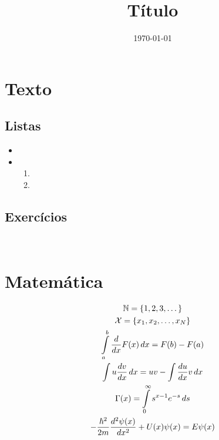 \documentclass[red, ccm, assignment]{templateccm}
\title{Título}              %
\date{\today}               %
\institute{Instituto}
\begin{document}
\maketitle

\section{Texto}

\lipsum[1-2]

\subsection{Listas}

\begin{itemize}
    \item \lipsum[3-3]
    \item \lipsum[4-4]
    \begin{enumerate}
        \item \lipsum[5-5]
        \item \lipsum[6-6]
    \end{enumerate}
\end{itemize}

\subsection{Exercícios}

\begin{exercise}
    \item \lipsum[7-7]
    \item \lipsum[8-8]
    \item ~
    \begin{exercise}
        \item \lipsum[9-9]
        \item \lipsum[10-10]
    \end{exercise}
\end{exercise}

\section{Matemática}

\begin{gather*}
    \mathbb{N} = \{ 1, 2, 3, \dots \} \\
    \mathcal{X} = \{ x_1, x_2, \dots, x_N \} \\
    \int\limits_a^b {\frac{d}{dx} F(x) \, dx}  = F(b) - F(a) \\
    \int u \frac{dv}{dx} \, dx = uv - \int \frac{du}{dx} v \, dx \\
    \Gamma(x) = \int\limits_0^\infty s^{x - 1} e^{-s} \, ds \\
    -\frac{\hbar^2}{2m}\frac{d^2 \psi(x)}{dx^2} + U(x)\psi (x) = E \psi(x)
\end{gather*}
\end{document}
